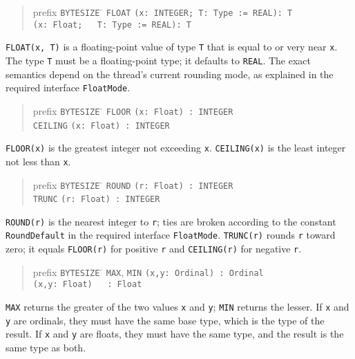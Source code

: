\documentclass[10pt]{article}
\begin{document}
\begin{quote}
  \begin{tabbing}
    prefix \= \verb|BYTESIZE| \= \kill
           \> \verb|FLOAT|   \> \verb|(x: INTEGER; T: Type := REAL): T| \\
           \>                \> \verb|(x: Float;   T: Type := REAL): T|
  \end{tabbing}
\end{quote}
\verb|FLOAT(x, T)| is a floating-point value of type \verb|T| that is equal to
or very near \verb|x|.  The type \verb|T| must be a floating-point type; it
defaults to \verb|REAL|.  The exact semantics depend on the thread's current
rounding mode, as explained in the required interface \verb|FloatMode|.

\begin{quote}
  \begin{tabbing}
    prefix \= \verb|BYTESIZE| \= \kill
           \> \verb|FLOOR|   \> \verb|(x: Float) : INTEGER| \\
           \> \verb|CEILING| \> \verb|(x: Float) : INTEGER|
  \end{tabbing}
\end{quote}
\verb|FLOOR(x)| is the greatest integer not exceeding \verb|x|.
\verb|CEILING(x)| is the least integer not less than \verb|x|.

\begin{quote}
  \begin{tabbing}
    prefix \= \verb|BYTESIZE| \= \kill
           \> \verb|ROUND|   \> \verb|(r: Float) : INTEGER| \\
           \> \verb|TRUNC|   \> \verb|(r: Float) : INTEGER|
  \end{tabbing}
\end{quote}
\verb|ROUND(r)| is the nearest integer to \verb|r|; ties are broken according
to the constant \verb|RoundDefault| in the required interface
\verb|FloatMode|.  \verb|TRUNC(r)| rounds \verb|r| toward zero; it equals
\verb|FLOOR(r)| for positive \verb|r| and \verb|CEILING(r)| for negative
\verb|r|.

\begin{quote}
  \begin{tabbing}
    prefix \= \verb|BYTESIZE| \= \kill
           \> \verb|MAX|, \verb|MIN| \> \verb|(x,y: Ordinal) : Ordinal| \\
           \>                        \> \verb|(x,y: Float)   : Float|
  \end{tabbing}
\end{quote}
\verb|MAX| returns the greater of the two values \verb|x| and \verb|y|;
\verb|MIN| returns the lesser.  If \verb|x| and \verb|y| are ordinals, they
must have the same base type, which is the type of the result.  If \verb|x|
and \verb|y| are floats, they must have the same type, and the result is the
same type as both.
\end{document}
